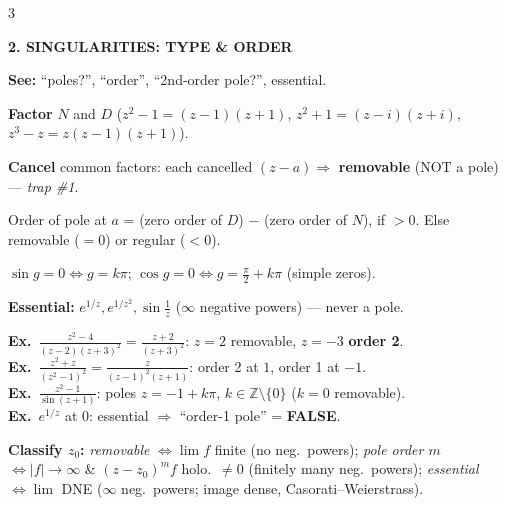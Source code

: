 \documentclass[a4paper,8pt]{extarticle}
\newcommand{\topic}[2]{%
  \vspace{4.5pt}%
  {\colorbox{#1}{\parbox{\dimexpr\columnwidth-2\fboxsep}{\color{white}\bfseries\footnotesize #2}}}\par\vspace{2.5pt}}
\newcommand{\when}[1]{{\color{cA}\footnotesize\textbf{\textsf{See:}}} #1\par}
\newcommand{\exo}{\textbf{\textcolor{cA}{Ex.}}\ }
\newcommand{\Z}{\mathbb{Z}}
\newcommand{\To}{\!\to\!}
\begin{document}
\begin{multicols}{3}
\topic{cA}{2. SINGULARITIES: TYPE \& ORDER}
\when{``poles?'', ``order'', ``2nd-order pole?'', essential.}
\begin{recipe}
\item \textbf{Factor} $N$ and $D$ ($z^2{-}1{=}(z{-}1)(z{+}1)$, $z^2{+}1{=}(z{-}i)(z{+}i)$, $z^3{-}z{=}z(z{-}1)(z{+}1)$).
\item \textbf{Cancel} common factors: each cancelled $(z{-}a)\Rightarrow$ \textbf{removable} (NOT a pole) — \emph{trap \#1}.
\item Order of pole at $a$ = (zero order of $D$) $-$ (zero order of $N$), if $>0$. Else removable ($=0$) or regular ($<0$).
\item $\sin g{=}0\iff g{=}k\pi$; $\cos g{=}0\iff g{=}\tfrac\pi2{+}k\pi$ (simple zeros).
\item \textbf{Essential:} $e^{1/z},e^{1/z^2},\sin\frac1z$ ($\infty$ negative powers) — never a pole.
\end{recipe}
\begin{ex}
\exo $\frac{z^2-4}{(z-2)(z+3)^2}=\frac{z+2}{(z+3)^2}$: $z{=}2$ removable, $z{=}{-}3$ \textbf{order 2}.\\
\exo $\frac{z^2+z}{(z^2-1)^2}=\frac{z}{(z-1)^2(z+1)}$: order 2 at $1$, order 1 at $-1$.\\
\exo $\frac{z^2-1}{\sin(z+1)}$: poles $z={-}1{+}k\pi$, $k\in\Z\setminus\{0\}$ ($k{=}0$ removable).\\
\exo $e^{1/z}$ at $0$: essential $\Rightarrow$ ``order-1 pole'' = \textbf{FALSE}.
\end{ex}
\begin{thm}\textbf{Classify $z_0$:} \emph{removable} $\Leftrightarrow\lim f$ finite (no neg.\ powers); \emph{pole order $m$} $\Leftrightarrow|f|\To\infty$ \& $(z{-}z_0)^mf$ holo.\ $\ne0$ (finitely many neg.\ powers); \emph{essential} $\Leftrightarrow\lim$ DNE ($\infty$ neg.\ powers; image dense, Casorati--Weierstrass).\end{thm}


\end{multicols}
\end{document}
